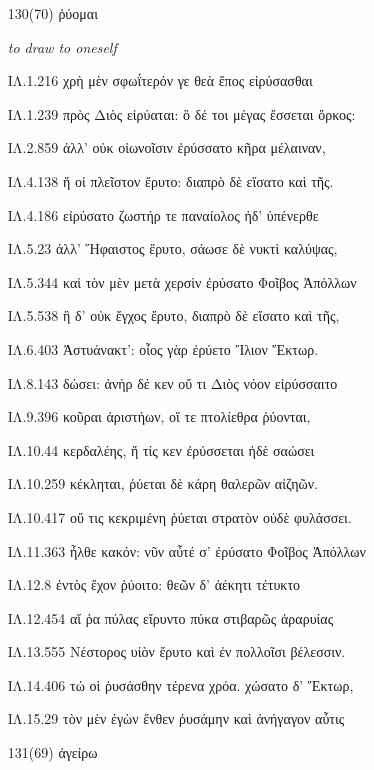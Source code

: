 \begin{enumerate}
{ΙΛ.22.501 μυελὸν οἶον ἔδεσκε καὶ οἰῶν πίονα δημόν:

ΙΛ.22.509 αἰόλαι εὐλαὶ ἔδονται, ἐπεί κε κύνες κορέσωνται

ΙΛ.24.129 σὴν ἔδεαι κραδίην μεμνημένος οὔτε τι σίτου

}

\clearpage
\item[\large 130(70)]{\large \g ῥύομαι	}

\hspace{0.2cm} \textit{ to draw to oneself }

{\g
ΙΛ.1.216 χρὴ μὲν σφωΐτερόν γε θεὰ ἔπος εἰρύσασθαι

ΙΛ.1.239 πρὸς Διὸς εἰρύαται: ὃ δέ τοι μέγας ἔσσεται ὅρκος:

ΙΛ.2.859 ἀλλ' οὐκ οἰωνοῖσιν ἐρύσσατο κῆρα μέλαιναν,

ΙΛ.4.138 ἥ οἱ πλεῖστον ἔρυτο: διαπρὸ δὲ εἴσατο καὶ τῆς.

ΙΛ.4.186 εἰρύσατο ζωστήρ τε παναίολος ἠδ' ὑπένερθε

ΙΛ.5.23 ἀλλ' Ἥφαιστος ἔρυτο, σάωσε δὲ νυκτὶ καλύψας,

ΙΛ.5.344 καὶ τὸν μὲν μετὰ χερσὶν ἐρύσατο Φοῖβος Ἀπόλλων

ΙΛ.5.538 ἣ δ' οὐκ ἔγχος ἔρυτο, διαπρὸ δὲ εἴσατο καὶ τῆς,

ΙΛ.6.403 Ἀστυάνακτ': οἶος γὰρ ἐρύετο Ἴλιον Ἕκτωρ.

ΙΛ.8.143 δώσει: ἀνὴρ δέ κεν οὔ τι Διὸς νόον εἰρύσσαιτο

ΙΛ.9.396 κοῦραι ἀριστήων, οἵ τε πτολίεθρα ῥύονται,

ΙΛ.10.44 κερδαλέης, ἥ τίς κεν ἐρύσσεται ἠδὲ σαώσει

ΙΛ.10.259 κέκληται, ῥύεται δὲ κάρη θαλερῶν αἰζηῶν.

ΙΛ.10.417 οὔ τις κεκριμένη ῥύεται στρατὸν οὐδὲ φυλάσσει.

ΙΛ.11.363 ἦλθε κακόν: νῦν αὖτέ σ' ἐρύσατο Φοῖβος Ἀπόλλων

ΙΛ.12.8 ἐντὸς ἔχον ῥύοιτο: θεῶν δ' ἀέκητι τέτυκτο

ΙΛ.12.454 αἵ ῥα πύλας εἴρυντο πύκα στιβαρῶς ἀραρυίας

ΙΛ.13.555 Νέστορος υἱὸν ἔρυτο καὶ ἐν πολλοῖσι βέλεσσιν.

ΙΛ.14.406 τώ οἱ ῥυσάσθην τέρενα χρόα. χώσατο δ' Ἕκτωρ,

ΙΛ.15.29 τὸν μὲν ἐγὼν ἔνθεν ῥυσάμην καὶ ἀνήγαγον αὖτις

}

\clearpage
\item[\large 131(69)]{\large \g ἀγείρω	}


\end{enumerate}
